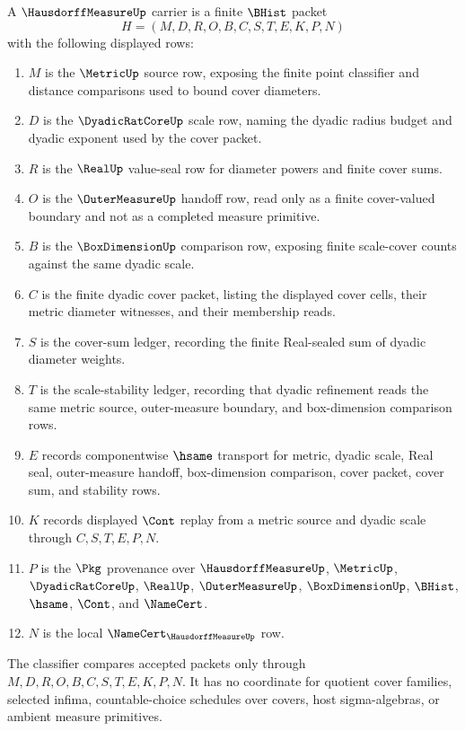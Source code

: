 \begin{definition}
\label{def:hausdorff-measure-carrier}
A $\HausdorffMeasureUp$ carrier is a finite $\BHist$ packet
$$
H=(M,D,R,O,B,C,S,T,E,K,P,N)
$$
with the following displayed rows:
\begin{enumerate}
\item $M$ is the $\MetricUp$ source row, exposing the finite point classifier and distance comparisons used to bound cover diameters.
\item $D$ is the $\DyadicRatCoreUp$ scale row, naming the dyadic radius budget and dyadic exponent used by the cover packet.
\item $R$ is the $\RealUp$ value-seal row for diameter powers and finite cover sums.
\item $O$ is the $\OuterMeasureUp$ handoff row, read only as a finite cover-valued boundary and not as a completed measure primitive.
\item $B$ is the $\BoxDimensionUp$ comparison row, exposing finite scale-cover counts against the same dyadic scale.
\item $C$ is the finite dyadic cover packet, listing the displayed cover cells, their metric diameter witnesses, and their membership reads.
\item $S$ is the cover-sum ledger, recording the finite Real-sealed sum of dyadic diameter weights.
\item $T$ is the scale-stability ledger, recording that dyadic refinement reads the same metric source, outer-measure boundary, and box-dimension comparison rows.
\item $E$ records componentwise $\hsame$ transport for metric, dyadic scale, Real seal, outer-measure handoff, box-dimension comparison, cover packet, cover sum, and stability rows.
\item $K$ records displayed $\Cont$ replay from a metric source and dyadic scale through $C,S,T,E,P,N$.
\item $P$ is the $\Pkg$ provenance over $\HausdorffMeasureUp$, $\MetricUp$, $\DyadicRatCoreUp$, $\RealUp$, $\OuterMeasureUp$, $\BoxDimensionUp$, $\BHist$, $\hsame$, $\Cont$, and $\NameCert$.
\item $N$ is the local $\NameCert_{\HausdorffMeasureUp}$ row.
\end{enumerate}
The classifier compares accepted packets only through $M,D,R,O,B,C,S,T,E,K,P,N$. It has no coordinate for quotient cover families, selected infima, countable-choice schedules over covers, host sigma-algebras, or ambient measure primitives.
\end{definition}

